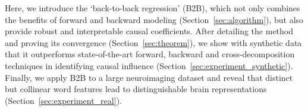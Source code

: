 Here, we introduce the `back-to-back regression' (B2B), which not only combines the benefits of forward and backward modeling (Section~\ref{sec:algorithm}), but also provide robust and interpretable causal coefficients. After detailing the method and proving its convergence (Section~\ref{sec:theorem}), we show with synthetic data that it outperforms state-of-the-art forward, backward and cross-decomposition techniques in identifying causal influence (Section~\ref{sec:experiment_synthetic}). Finally, we apply B2B to a large neuroimaging dataset and reveal that distinct but collinear word features lead to distinguishable brain representations (Section~\ref{sec:experiment_real}).
